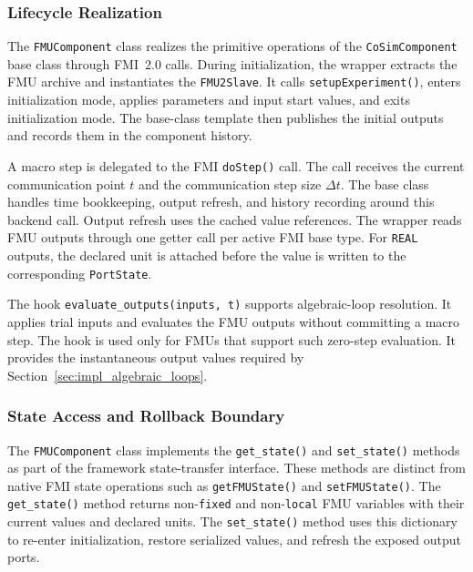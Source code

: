 \subsubsection{Lifecycle Realization}

The \texttt{FMUComponent} class realizes the primitive operations of the \texttt{CoSimComponent} base class through \ac{FMI}~2.0 calls.
During initialization, the wrapper extracts the \ac{FMU} archive and instantiates the \texttt{FMU2Slave}.
It calls \texttt{setupExperiment()}, enters initialization mode, applies parameters and input start values, and exits initialization mode.
The base-class template then publishes the initial outputs and records them in the component history.

A macro step is delegated to the \ac{FMI} \texttt{doStep()} call.
The call receives the current communication point $t$ and the communication step size $\Delta t$.
The base class handles time bookkeeping, output refresh, and history recording around this backend call.
Output refresh uses the cached value references.
The wrapper reads \ac{FMU} outputs through one getter call per active \ac{FMI} base type.
For \texttt{REAL} outputs, the declared unit is attached before the value is written to the corresponding \texttt{PortState}.

The hook \texttt{evaluate\_outputs(inputs, t)} supports algebraic-loop resolution.
It applies trial inputs and evaluates the \ac{FMU} outputs without committing a macro step.
The hook is used only for \acp{FMU} that support such zero-step evaluation.
It provides the instantaneous output values required by Section~\ref{sec:impl_algebraic_loops}.


\subsubsection{State Access and Rollback Boundary}

The \texttt{FMUComponent} class implements the \texttt{get\_state()} and \texttt{set\_state()} methods as part of the framework state-transfer interface.
These methods are distinct from native \ac{FMI} state operations such as \texttt{getFMUState()} and \texttt{setFMUState()}.
The \texttt{get\_state()} method returns non-\texttt{fixed} and non-\texttt{local} \ac{FMU} variables with their current values and declared units.
The \texttt{set\_state()} method uses this dictionary to re-enter initialization, restore serialized values, and refresh the exposed output ports.

